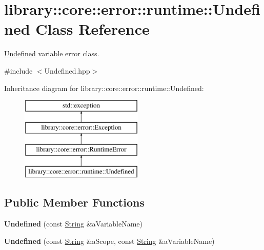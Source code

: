 \hypertarget{classlibrary_1_1core_1_1error_1_1runtime_1_1_undefined}{}\section{library\+:\+:core\+:\+:error\+:\+:runtime\+:\+:Undefined Class Reference}
\label{classlibrary_1_1core_1_1error_1_1runtime_1_1_undefined}


\hyperlink{classlibrary_1_1core_1_1error_1_1runtime_1_1_undefined}{Undefined} variable error class.  




{\ttfamily \#include $<$Undefined.\+hpp$>$}

Inheritance diagram for library\+:\+:core\+:\+:error\+:\+:runtime\+:\+:Undefined\+:\begin{figure}[H]
\begin{center}
\leavevmode
\includegraphics[height=4.000000cm]{classlibrary_1_1core_1_1error_1_1runtime_1_1_undefined}
\end{center}
\end{figure}
\subsection*{Public Member Functions}
\begin{DoxyCompactItemize}
\item 
\mbox{\label{classlibrary_1_1core_1_1error_1_1runtime_1_1_undefined_a585cecbe505147926980971fed942b95}} 
{\bfseries Undefined} (const \hyperlink{classlibrary_1_1core_1_1types_1_1_string}{String} \&a\+Variable\+Name)
\item 
\mbox{\label{classlibrary_1_1core_1_1error_1_1runtime_1_1_undefined_a61e341571e36a63bd0894c82b6be7427}} 
{\bfseries Undefined} (const \hyperlink{classlibrary_1_1core_1_1types_1_1_string}{String} \&a\+Scope, const \hyperlink{classlibrary_1_1core_1_1types_1_1_string}{String} \&a\+Variable\+Name)
\end{DoxyCompactItemize}


